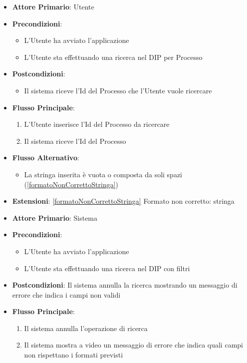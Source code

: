 \begin{itemize}
      \item \textbf{Attore Primario}: Utente
      \item \textbf{Precondizioni}:
      \begin{itemize}
            \item L'Utente ha avviato l'applicazione
            \item L'Utente sta effettuando una ricerca nel DIP per Processo
      \end{itemize}
      \item \textbf{Postcondizioni}:
      \begin{itemize}
            \item Il sistema riceve l'Id del Processo che l'Utente vuole ricercare
      \end{itemize}
      \item \textbf{Flusso Principale}:
      \begin{enumerate}
            \item L'Utente inserisce l'Id del Processo da ricercare
            \item Il sistema riceve l'Id del Processo
      \end{enumerate}
      \item \textbf{Flusso Alternativo}: \begin{itemize}
            \item La stringa inserita è vuota o composta da soli spazi (\ref{formatoNonCorrettoStringa})
      \end{itemize}
      \item \textbf{Estensioni}: \ref{formatoNonCorrettoStringa} Formato non corretto: stringa
\end{itemize}

\begin{itemize}
      \item \textbf{Attore Primario}: Sistema
      \item \textbf{Precondizioni}: 
      \begin{itemize}
            \item L'Utente ha avviato l'applicazione
            \item L'Utente sta effettuando una ricerca nel DIP con filtri
      \end{itemize}
      \item \textbf{Postcondizioni}: Il sistema annulla la ricerca mostrando un messaggio di errore che indica i campi non validi
      \item \textbf{Flusso Principale}:
      \begin{enumerate}
            \item Il sistema annulla l'operazione di ricerca
            \item Il sistema mostra a video un messaggio di errore che indica quali campi non rispettano i formati previsti
      \end{enumerate}
\end{itemize}


